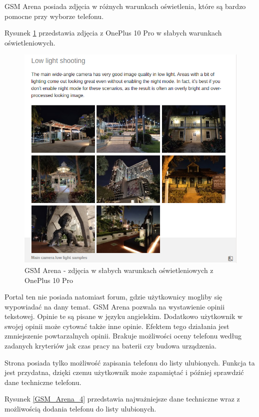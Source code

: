 GSM Arena posiada zdjęcia w różnych warunkach oświetlenia, które są bardzo pomocne przy wyborze telefonu. 

Rysunek \ref*{GSM_Arena_3} przedstawia zdjęcia z OnePlus 10 Pro w słabych warunkach oświetleniowych.
\begin{figure}[H]
    \centering
    \includegraphics[scale=0.7]{img/GSM Arena/GSMArena_picture_sample_lowlight.png}
    \caption{GSM Arena - zdjęcia w słabych warunkach oświetleniowych z OnePlus 10 Pro}
    \label{GSM_Arena_3}
\end{figure}
Portal ten nie posiada natomiast forum, gdzie użytkownicy mogliby się wypowiadać na dany temat. GSM Arena pozwala na wystawienie opinii tekstowej. Opinie te są pisane w języku angielskim. Dodatkowo użytkownik w swojej opinii może cytować także inne opinie. Efektem tego działania jest zmniejszenie powtarzalnych opinii. Brakuje możliwości oceny telefonu według zadanych kryteriów jak czas pracy na baterii czy budowa urządzenia.

Strona posiada tylko możliwość zapisania telefonu do listy ulubionych. Funkcja ta jest przydatna, dzięki czemu użytkownik może zapamiętać i później sprawdzić dane techniczne telefonu.

Rysunek \ref*{GSM_Arena_4} przedstawia najważniejsze dane techniczne wraz z możliwością dodania telefonu do listy ulubionych.

